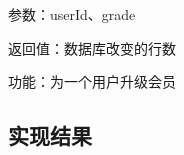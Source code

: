 参数：userId、grade

返回值：数据库改变的行数

功能：为一个用户升级会员

\subsection{实现结果}
\begin{figure}[H]
    \centering
\end{figure}
